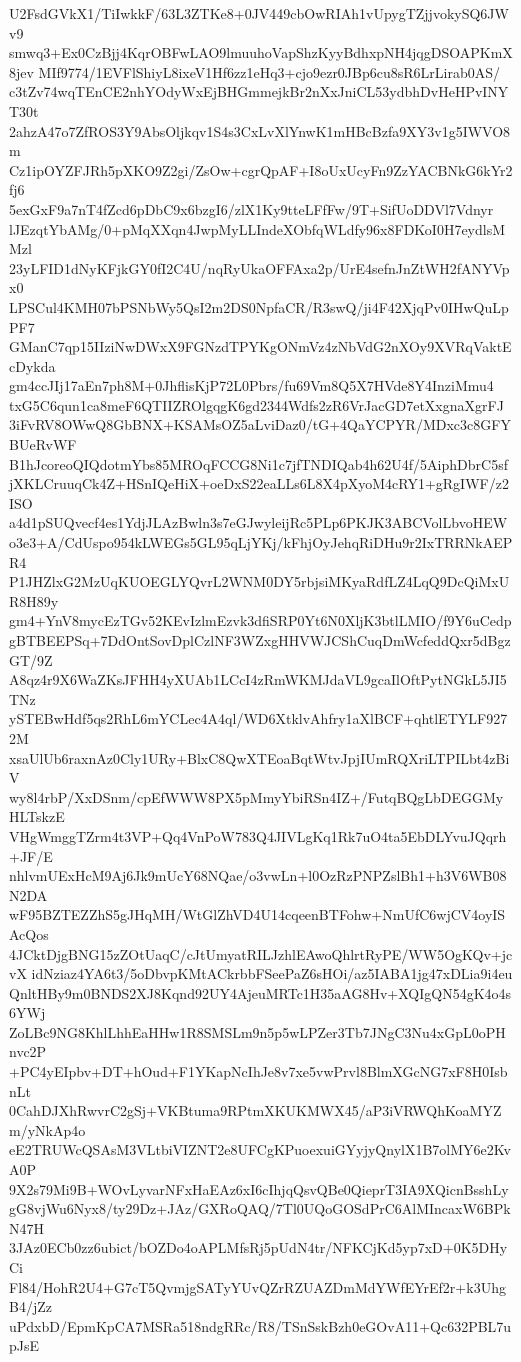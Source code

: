 U2FsdGVkX1/TiIwkkF/63L3ZTKe8+0JV449cbOwRIAh1vUpygTZjjvokySQ6JWv9
smwq3+Ex0CzBjj4KqrOBFwLAO9lmuuhoVapShzKyyBdhxpNH4jqgDSOAPKmX8jev
MIf9774/1EVFlShiyL8ixeV1Hf6zz1eHq3+cjo9ezr0JBp6cu8sR6LrLirab0AS/
c3tZv74wqTEnCE2nhYOdyWxEjBHGmmejkBr2nXxJniCL53ydbhDvHeHPvINYT30t
2ahzA47o7ZfROS3Y9AbsOljkqv1S4s3CxLvXlYnwK1mHBcBzfa9XY3v1g5IWVO8m
Cz1ipOYZFJRh5pXKO9Z2gi/ZsOw+cgrQpAF+I8oUxUcyFn9ZzYACBNkG6kYr2fj6
5exGxF9a7nT4fZcd6pDbC9x6bzgI6/zlX1Ky9tteLFfFw/9T+SifUoDDVl7Vdnyr
lJEzqtYbAMg/0+pMqXXqn4JwpMyLLIndeXObfqWLdfy96x8FDKoI0H7eydlsMMzl
23yLFID1dNyKFjkGY0fI2C4U/nqRyUkaOFFAxa2p/UrE4sefnJnZtWH2fANYVpx0
LPSCul4KMH07bPSNbWy5QsI2m2DS0NpfaCR/R3swQ/ji4F42XjqPv0IHwQuLpPF7
GManC7qp15IIziNwDWxX9FGNzdTPYKgONmVz4zNbVdG2nXOy9XVRqVaktEcDykda
gm4ccJIj17aEn7ph8M+0JhflisKjP72L0Pbrs/fu69Vm8Q5X7HVde8Y4InziMmu4
txG5C6qun1ca8meF6QTIIZROlgqgK6gd2344Wdfs2zR6VrJacGD7etXxgnaXgrFJ
3iFvRV8OWwQ8GbBNX+KSAMsOZ5aLviDaz0/tG+4QaYCPYR/MDxc3c8GFYBUeRvWF
B1hJcoreoQIQdotmYbs85MROqFCCG8Ni1c7jfTNDIQab4h62U4f/5AiphDbrC5sf
jXKLCruuqCk4Z+HSnIQeHiX+oeDxS22eaLLs6L8X4pXyoM4cRY1+gRgIWF/z2ISO
a4d1pSUQvecf4es1YdjJLAzBwln3s7eGJwyleijRc5PLp6PKJK3ABCVolLbvoHEW
o3e3+A/CdUspo954kLWEGs5GL95qLjYKj/kFhjOyJehqRiDHu9r2IxTRRNkAEPR4
P1JHZlxG2MzUqKUOEGLYQvrL2WNM0DY5rbjsiMKyaRdfLZ4LqQ9DcQiMxUR8H89y
gm4+YnV8mycEzTGv52KEvIzlmEzvk3dfiSRP0Yt6N0XljK3btlLMIO/f9Y6uCedp
gBTBEEPSq+7DdOntSovDplCzlNF3WZxgHHVWJCShCuqDmWcfeddQxr5dBgzGT/9Z
A8qz4r9X6WaZKsJFHH4yXUAb1LCcI4zRmWKMJdaVL9gcaIlOftPytNGkL5JI5TNz
ySTEBwHdf5qs2RhL6mYCLec4A4ql/WD6XtklvAhfry1aXlBCF+qhtlETYLF9272M
xsaUlUb6raxnAz0Cly1URy+BlxC8QwXTEoaBqtWtvJpjIUmRQXriLTPILbt4zBiV
wy8l4rbP/XxDSnm/cpEfWWW8PX5pMmyYbiRSn4IZ+/FutqBQgLbDEGGMyHLTskzE
VHgWmggTZrm4t3VP+Qq4VnPoW783Q4JIVLgKq1Rk7uO4ta5EbDLYvuJQqrh+JF/E
nhlvmUExHcM9Aj6Jk9mUcY68NQae/o3vwLn+l0OzRzPNPZslBh1+h3V6WB08N2DA
wF95BZTEZZhS5gJHqMH/WtGlZhVD4U14cqeenBTFohw+NmUfC6wjCV4oyISAcQos
4JCktDjgBNG15zZOtUaqC/cJtUmyatRILJzhlEAwoQhlrtRyPE/WW5OgKQv+jcvX
idNziaz4YA6t3/5oDbvpKMtACkrbbFSeePaZ6sHOi/az5IABA1jg47xDLia9i4eu
QnltHBy9m0BNDS2XJ8Kqnd92UY4AjeuMRTc1H35aAG8Hv+XQIgQN54gK4o4s6YWj
ZoLBc9NG8KhlLhhEaHHw1R8SMSLm9n5p5wLPZer3Tb7JNgC3Nu4xGpL0oPHnvc2P
+PC4yEIpbv+DT+hOud+F1YKapNcIhJe8v7xe5vwPrvl8BlmXGcNG7xF8H0IsbnLt
0CahDJXhRwvrC2gSj+VKBtuma9RPtmXKUKMWX45/aP3iVRWQhKoaMYZm/yNkAp4o
eE2TRUWcQSAsM3VLtbiVIZNT2e8UFCgKPuoexuiGYyjyQnylX1B7olMY6e2KvA0P
9X2s79Mi9B+WOvLyvarNFxHaEAz6xI6cIhjqQsvQBe0QieprT3IA9XQicnBsshLy
gG8vjWu6Nyx8/ty29Dz+JAz/GXRoQAQ/7Tl0UQoGOSdPrC6AlMIncaxW6BPkN47H
3JAz0ECb0zz6ubict/bOZDo4oAPLMfsRj5pUdN4tr/NFKCjKd5yp7xD+0K5DHyCi
Fl84/HohR2U4+G7cT5QvmjgSATyYUvQZrRZUAZDmMdYWfEYrEf2r+k3UhgB4/jZz
uPdxbD/EpmKpCA7MSRa518ndgRRc/R8/TSnSskBzh0eGOvA11+Qc632PBL7upJsE
